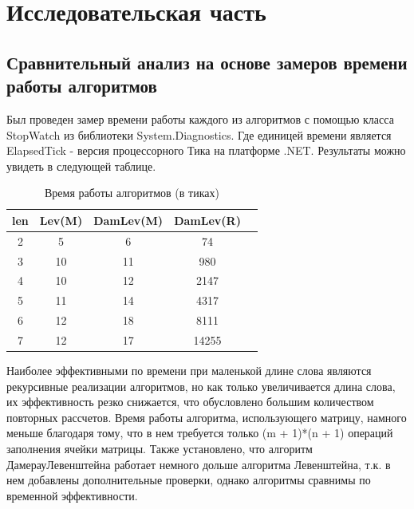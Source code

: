 \documentclass[12pt]{report}
\begin{document}
\chapter{Исследовательская часть}

\section{Сравнительный анализ на основе замеров времени работы алгоритмов}

Был проведен замер времени работы каждого из алгоритмов с помощью класса StopWatch из библиотеки System.Diagnostics.
Где единицей времени является ElapsedTick - версия процессорного Тика на платформе .NET. Результаты можно увидеть в следующей таблице.

\begin{table} [h!]
\caption{Время работы алгоритмов (в тиках)}
	\begin{tabular}{|c c c c c|} 
 	\hline
	len & Lev(M) & DamLev(M) & DamLev(R) \\ [0.5ex] 
 	\hline\hline
 	2 & 5 & 6 & 74\\
 	\hline
 	3 & 10 & 11 & 980\\
 	\hline
 	4 & 10 & 12 & 2147\\
 	\hline
	5 & 11 & 14 & 4317\\
	\hline
	6 & 12 & 18 & 8111\\
	\hline
	7 & 12 & 17 & 14255\\
	\hline
	\end{tabular}
\end{table}




\par
Наиболее эффективными по времени при маленькой длине слова являются рекурсивные реализации алгоритмов, но как только увеличивается длина слова, их эффективность резко снижается, что обусловлено большим количеством повторных рассчетов. Время работы алгоритма, использующего матрицу, намного меньше благодаря тому, что в нем требуется только (m + 1)*(n + 1) операций заполнения ячейки матрицы. Также установлено, что алгоритм ДамерауЛевенштейна работает немного дольше алгоритма Левенштейна, т.к. в нем добавлены дополнительные проверки, однако алгоритмы сравнимы по временной эффективности.
\end{document}

